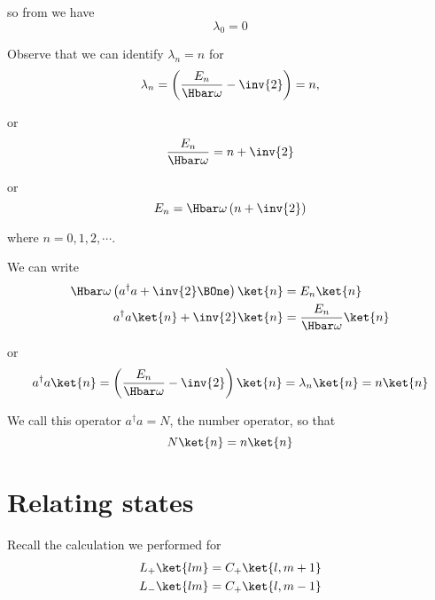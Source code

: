 so from  we have
%
\begin{equation}\label{eqn:PHY356FLecture11:140}
\lambda_0 = 0
\end{equation}

Observe that we can identify \(\lambda_n = n\) for
%
\begin{equation}\label{eqn:PHY356FLecture11:150}
\lambda_n = \left( \frac{E_n}{\Hbar\omega} - \inv{2} \right) = n,
\end{equation}

or
\begin{equation}\label{eqn:PHY356FLecture11:155}
\frac{E_n}{\Hbar\omega} = n + \inv{2}
\end{equation}

or
\begin{equation}\label{eqn:PHY356FLecture11:160}
E_n = \Hbar \omega \left( n + \inv{2} \right)
\end{equation}

where \(n = 0, 1, 2, \cdots\).

We can write
%
\begin{equation}\label{eqn:lecture11harmonicOscillator:720}
\begin{aligned}
\Hbar \omega \left( a^\dagger a + \inv{2} \BOne \right) \ket{n} &= E_n \ket{n} \\
a^\dagger a \ket{n} + \inv{2} \ket{n} &= \frac{E_n}{\Hbar \omega} \ket{n} \\
\end{aligned}
\end{equation}

or
\begin{equation}\label{eqn:PHY356FLecture11:170}
a^\dagger a \ket{n} = \left( \frac{E_n}{\Hbar \omega} - \inv{2} \right) \ket{n} = \lambda_n \ket{n} = n \ket{n}
\end{equation}

We call this operator \(a^\dagger a = N\), the number operator, so that
%
\begin{equation}\label{eqn:PHY356FLecture11:180}
N \ket{n} = n \ket{n}
\end{equation}

\section{Relating states}

Recall the calculation we performed for
%
\begin{equation}\label{eqn:PHY356FLecture11:200}
\begin{aligned}
L_{+} \ket{lm} &= C_{+} \ket{l, m+1} \\
L_{-} \ket{lm} &= C_{+} \ket{l, m-1}
\end{aligned}
\end{equation}

